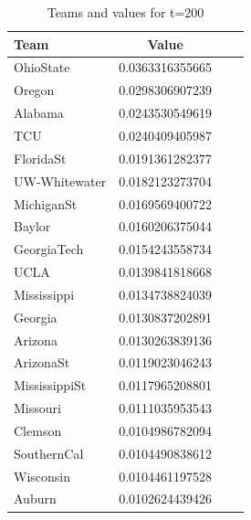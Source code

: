 \documentclass[11pt]{article}
\begin{document}
\begin{table}[!th]
\centering
\begin{tabular}{|l|c|cl}
\hline
Team & Value \\
\hline
OhioState & 0.0363316355665 \\
Oregon & 0.0298306907239 \\
Alabama & 0.0243530549619 \\
TCU & 0.0240409405987 \\
FloridaSt & 0.0191361282377 \\
UW-Whitewater & 0.0182123273704 \\
MichiganSt & 0.0169569400722 \\
Baylor & 0.0160206375044 \\
GeorgiaTech & 0.0154243558734 \\
UCLA & 0.0139841818668 \\
Mississippi & 0.0134738824039 \\
Georgia & 0.0130837202891 \\
Arizona & 0.0130263839136 \\
ArizonaSt & 0.0119023046243 \\
MississippiSt & 0.0117965208801 \\
Missouri & 0.0111035953543 \\
Clemson & 0.0104986782094 \\
SouthernCal & 0.0104490838612 \\
Wisconsin & 0.0104461197528 \\
Auburn & 0.0102624439426 \\
\hline
\end{tabular}
\caption{Teams and values for t=200}
\label{ex:table}
\end{table}
\end{document}
